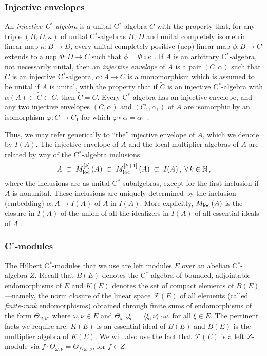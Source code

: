 \documentclass{amsart}
\theoremstyle{definition}
\theoremstyle{remark}
\begin{document}
\subsubsection*{Injective envelopes}

An \emph{injective C$^*$-algebra} is a unital C$^*$-algebra $C$
with the property that, for any triple $(B,D, \kappa)$ of unital C$^*$-algebras $B$, $D$
and unital completely isometric linear map $\kappa:B\rightarrow D$, every unital completely positive (ucp) linear
map $\phi:B\rightarrow C$ extends to a ucp
$\Phi:D\rightarrow C$ such that $\phi=\Phi\circ\kappa$ \cite[\S IV.2]{Blackadar-book}.
If $A$ is an arbitrary C$^*$-algebra, not necessarily unital, then an \emph{injective envelope} of $A$ is a pair $(C,\alpha)$
such that $C$ is an injective C$^*$-algebra, $\alpha:A\rightarrow C$ is a monomorphism which is assumed to be unital if $A$ is unital,
with the property that if $\tilde C$ is an injective C$^*$-algebra with $\alpha(A)\subset\tilde C\subset C$,
then $\tilde C=C$.
Every C$^*$-algebra has an injective envelope, and any two injective envelopes $(C,\alpha)$ and $(C_1,\alpha_1)$
of $A$ are
isomorphic by an isomorphism $\varphi:C\rightarrow C_1$ for which $\varphi\circ\alpha=\alpha_1$ \cite{hamana1979a}.

Thus, we may refer generically to ``the'' injective envelope of $A$, which we denote by $I(A)$.
The injective envelope of $A$ and the local multiplier algebras of $A$ are related by way of the
C$^*$-algebra inclusions
\begin{equation}\label{fp inclusion}
A\;\subset \;{M_{\rm loc}^{[k]}\,}(A)\;\subset\; {M_{\rm loc}^{[k+1]}\,}(A)\;\subset\; I(A)\,,\;\forall\,k\in\mathbb N\,,
\end{equation}
where the inclusions are as unital C$^*$-subalgebras, except for the first inclusion if $A$ is nonunital.
These inclusions are uniquely determined by the inclusion (embedding) $\alpha:A\rightarrow I(A)$ of $A$ in $I(A)$.
More explicitly, ${M_{\rm loc}\,}(A)$ is the closure in $I(A)$ of the union of all the idealizers in $I(A)$ of all essential
ideals of $A$
\cite{frank--paulsen2003}.

\subsubsection*{C$^*$-modules}

The Hilbert C$^*$-modules \cite[\S II.7]{Blackadar-book}
that we use are left modules $E$ over an abelian C$^*$-algebra $Z$.
Recall that $B(E)$ denotes the C$^*$-algebra of bounded, adjointable endomorphisms of $E$ and
$K(E)$ denotes the set of compact elements of $B(E)$---namely, the norm closure of the linear
space $\mathcal F(E)$ of all elements (called \emph{finite-rank} endomorphisms) obtained through finite
sums of endomorphisms of the form $\Theta_{\omega,\nu}$, where $\omega,\nu\in E$ and
$\Theta_{\omega,\nu}\xi\,=\,\langle\xi,\nu\rangle\cdot\omega$, for all $\xi\in E$. The pertinent facts
we require are: $K(E)$ is an essential ideal of $B(E)$ and $B(E)$ is the multiplier algebra of $K(E)$.
We will also use the fact that $\mathcal F(E)$ is a left $Z$-module via $f\cdot \Theta_{\omega,\nu}=\Theta_{f\cdot\omega,\nu}$,
for $f\in Z$.
 
\end{document}
